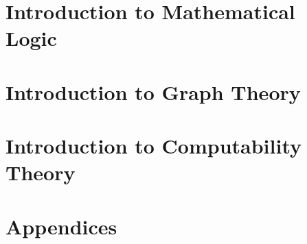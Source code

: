   \part{Introduction to Mathematical Logic}
  \label{part:logic}
  
  

  \part{Introduction to Graph Theory}
  \label{part:graph-theory}
  
  
  

  \part{Introduction to Computability Theory}
  \label{part:computability}
  
  
  
  
  

  \appendix
  \part{Appendices}
  

